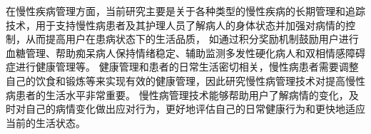 





在慢性疾病管理方面，当前研究主要是关于各种类型的慢性疾病的长期管理和追踪技术，用于支持慢性病患者及其护理人员了解病人的身体状态并加强对病情的控制，从而提高用户在患病状态下的生活品质，
如通过积分奖励机制鼓励用户进行血糖管理\cite{burgermaster2019personal}、帮助痴呆病人保持情绪稳定\cite{lazar2016evaluation}、辅助监测多发性硬化病人\cite{bardram2013designing}和双相情感障碍症进行健康管理\cite{ayobi2017quantifying}等。
健康管理和患者的日常生活密切相关，慢性病患者需要调整自己的饮食和锻炼等来实现有效的健康管理\cite{nunes2018understanding}，因此研究慢性病管理技术对提高慢性病患者的生活水平非常重要。
慢性病管理技术能够帮助用户了解病情的变化，及时对自己的病情变化做出应对行为，更好地评估自己的日常健康行为和更快地适应当前的生活状态\cite{ayobi2017quantifying}。




